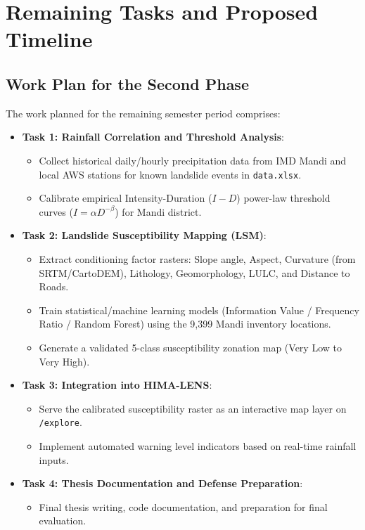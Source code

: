 \documentclass[12pt,a4paper]{report}
\begin{document}
\chapter{Remaining Tasks and Proposed Timeline}

\section{Work Plan for the Second Phase}
The work planned for the remaining semester period comprises:
\begin{itemize}
    \item \textbf{Task 1: Rainfall Correlation and Threshold Analysis}:
    \begin{itemize}
        \item Collect historical daily/hourly precipitation data from IMD Mandi and local AWS stations for known landslide events in \texttt{data.xlsx}.
        \item Calibrate empirical Intensity-Duration ($I-D$) power-law threshold curves ($I = \alpha D^{-\beta}$) for Mandi district.
    \end{itemize}
    \item \textbf{Task 2: Landslide Susceptibility Mapping (LSM)}:
    \begin{itemize}
        \item Extract conditioning factor rasters: Slope angle, Aspect, Curvature (from SRTM/CartoDEM), Lithology, Geomorphology, LULC, and Distance to Roads.
        \item Train statistical/machine learning models (Information Value / Frequency Ratio / Random Forest) using the 9,399 Mandi inventory locations.
        \item Generate a validated 5-class susceptibility zonation map (Very Low to Very High).
    \end{itemize}
    \item \textbf{Task 3: Integration into HIMA-LENS}:
    \begin{itemize}
        \item Serve the calibrated susceptibility raster as an interactive map layer on \texttt{/explore}.
        \item Implement automated warning level indicators based on real-time rainfall inputs.
    \end{itemize}
    \item \textbf{Task 4: Thesis Documentation and Defense Preparation}:
    \begin{itemize}
        \item Final thesis writing, code documentation, and preparation for final evaluation.
    \end{itemize}
\end{itemize}
\end{document}
